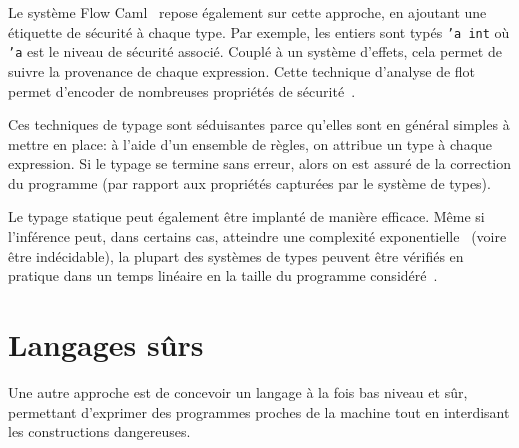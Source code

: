 Le système Flow Caml~\cite{flowcaml} repose également sur cette approche, en
ajoutant une étiquette de sécurité à chaque type. Par exemple, les entiers sont
typés \texttt{'a int} où \texttt{'a} est le niveau de sécurité associé. Couplé à
un système d'effets, cela permet de suivre la provenance de chaque expression.
Cette technique d'analyse de flot permet d'encoder de nombreuses propriétés de
sécurité~\cite{sm-jsac03}.

Ces techniques de typage sont séduisantes parce qu'elles sont en général simples
à mettre en place: à l'aide d'un ensemble de règles, on attribue un type à
chaque expression. Si le typage se termine sans erreur, alors on est assuré de
la correction du programme (par rapport aux propriétés capturées par le système
de types).

Le typage statique peut également être implanté de manière efficace. Même si
l'inférence peut, dans certains cas, atteindre une complexité
exponentielle~\cite{mairson} (voire être indécidable), la plupart des systèmes
de types peuvent être vérifiés en pratique dans un temps linéaire en la taille
du programme considéré~\cite{rta03}.

\section{Langages sûrs}

Une autre approche est de concevoir un langage à la fois bas niveau et sûr,
permettant d'exprimer des programmes proches de la machine tout en interdisant
les constructions dangereuses.

